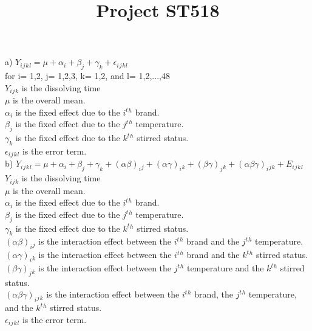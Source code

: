 \documentclass{article}
\title{Project ST518}
\begin{document}
\maketitle

\noindent a) $Y_i{}_j{}_k{}_l{}= \mu + \alpha_i + \beta_j + \gamma_k+ \epsilon_i{}_j{}_k{}_l{} $ \\ 

\noindent for i= 1,2, j= 1,2,3, k= 1,2, and l= 1,2,...,48\\

\noindent $Y_i{}_j{}_k{}$ is the dissolving time\\

\noindent $\mu$ is the overall mean.\\

\noindent $\alpha_i$ is the fixed effect due to the $i^t{}^h{}$ brand.\\

\noindent $\beta_j$ is the fixed effect due to the $j^t{}^h{}$ temperature.\\

\noindent $\gamma_k$ is the fixed effect due to the $k^t{}^h{}$ stirred status.\\

\noindent $\epsilon_i{}_j{}_k{}_l{}$ is the error term.\\


\noindent b) $Y_i{}_j{}_k{}_l{}= \mu + \alpha_i + \beta_j + \gamma_k + (\alpha\beta)_i{}_j{}+ (\alpha\gamma)_i{}_k{}+ (\beta\gamma)_j{}_k{} + (\alpha\beta\gamma)_i{}_j{}_k{} +  E_i{}_j{}_k{}_l{} $ \\ 

\noindent $Y_i{}_j{}_k{}$ is the dissolving time\\

\noindent $\mu$ is the overall mean.\\

\noindent $\alpha_i$ is the fixed effect due to the $i^t{}^h{}$ brand.\\

\noindent $\beta_j$ is the fixed effect due to the $j^t{}^h{}$ temperature.\\

\noindent $\gamma_k$ is the fixed effect due to the $k^t{}^h{}$ stirred status.\\

\noindent $(\alpha\beta)_i{}_j{}$ is the interaction effect between the $i^t{}^h{}$ brand and the $j^t{}^h{}$ temperature.\\

\noindent $(\alpha\gamma)_i{}_k{}$ is the interaction effect between the $i^t{}^h{}$ brand and the $k^t{}^h{}$ stirred status.\\

\noindent $(\beta\gamma)_j{}_k{}$ is the interaction effect between the $j^t{}^h{}$ temperature and the $k^t{}^h{}$ stirred status.\\

\noindent $(\alpha\beta\gamma)_i{}_j{}_k{}$ is the interaction effect between the $i^t{}^h{}$ brand, the $j^t{}^h{}$ temperature, and the $k^t{}^h{}$ stirred status.\\

\noindent $\epsilon_i{}_j{}_k{}_l{}$ is the error term.\\
\end{document}
